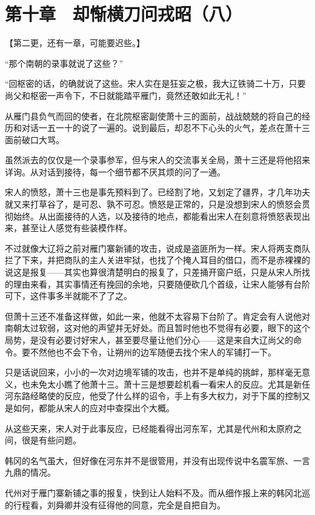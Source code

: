 \section{第十章　却惭横刀问戎昭（八）}

【第二更，还有一章，可能要迟些。】

“那个南朝的录事就说了这些？”

“回枢密的话，的确就说了这些。宋人实在是狂妄之极，我大辽铁骑二十万，只要尚父和枢密一声令下，不日就能踏平雁门，竟然还敢如此无礼！”

从雁门县负气而回的使者，在北院枢密副使萧十三的面前，战战兢兢的将自己的经历和对话一五一十的说了一遍的。说到最后，却忍不下心头的火气，差点在萧十三面前破口大骂。

虽然派去的仅仅是一个录事参军，但与宋人的交流事关全局，萧十三还是将他招来详询。从对话到接待，每一个细节都不厌其烦的问了一通。

宋人的愤怒，萧十三也是事先预料到了。已经割了地，又划定了疆界，才几年功夫就又来打草谷了，是可忍、孰不可忍。愤怒是正常的，只是没想到宋人的愤怒会贯彻始终。从出面接待的人选，以及接待的地点，都能看出宋人在刻意将愤怒表现出来，甚至让人感觉有些装模作样。

不过就像大辽将之前对雁门寨新铺的攻击，说成是盗匪所为一样。宋人将两支商队拦了下来，并把商队的主人关进牢狱，也找了个掩人耳目的借口，而不是赤裸裸的说这是报复——其实也算很清楚明白的报复了，只差捅开窗户纸，只是从宋人所找的理由来看，其实事情还有挽回的余地，只要随便砍几个首级，让宋人能够有台阶可下，这件事多半就能不了了之。

但萧十三还不准备这样做，如此一来，他就不太容易下台阶了。肯定会有人说他对南朝太过软弱，这对他的声望并无好处。而且暂时他也不觉得有必要，眼下的这个局势，是没有必要讨好宋人，甚至要尽量让他们分心——这是来自大辽尚父的命令。要不然他也不会下令，让朔州的边军随便去找个宋人的军铺打一下。

只是话说回来，小小的一次对边境军铺的攻击，也并不是单纯的挑衅，那样毫无意义，也未免太小瞧了他萧十三。萧十三是想要趁机看一看宋人的反应。尤其是新任河东路经略使的反应，他受了什么样的诏令，手上有多大权力，对于下属的控制又是如何，都能从宋人的应对中查探出个大概。

从这些天来，宋人对于此事反应，已经能看得出河东军，尤其是代州和太原府之间，很是有些问题。

韩冈的名气虽大，但好像在河东并不是很管用，并没有出现传说中名震军旅、一言九鼎的情况。

代州对于雁门寨新铺之事的报复，快到让人始料不及。而从细作报上来的韩冈北巡的行程看，刘舜卿并没有征得他的同意，完全是自把自为。

